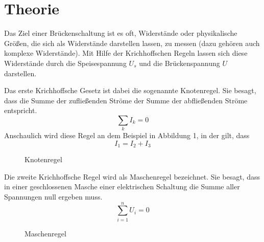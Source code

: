 \section{Theorie}
\usetikzlibrary{circuits.ee.IEC}
\label{sec:Theorie}

Das Ziel einer Brückenschaltung ist es oft, Widerstände oder 
physikalische Größen, die sich als Widerstände darstellen lassen, zu messen 
(dazu gehören auch komplexe Widerstände).
Mit Hilfe der Krichhoffschen Regeln lassen sich diese Widerstände durch die 
Speisespannung $U_s$ und die Brückenspannung $U$ darstellen.

Das erste Krichhoffsche Gesetz ist dabei die sogenannte Knotenregel. 
Sie besagt, dass die Summe der zufließenden Ströme der Summe der
abfließenden Ströme entspricht. 
\begin{equation}
\sum_{k} I_k = 0
\end{equation}
Anschaulich wird diese Regel an dem Beispiel in Abbildung 1, in der gilt, dass
\begin{equation}
I_1=I_2+I_3
\end{equation}

\begin{figure}
    \centering
    \caption{Knotenregel}
    \label{fig:Knotenregel}
\end{figure}

Die zweite Krichhoffsche Regel wird als Maschenregel bezeichnet. Sie besagt, dass 
in einer geschlossenen Masche einer elektrischen Schaltung die Summe aller 
Spannungen null ergeben muss.
\begin{equation}
\sum_{i=1}^n  U_i = 0
\end{equation}

\begin{figure}
    \centering
    \caption{Maschenregel}
    \label{fig:Maschenregel}
\end{figure}

